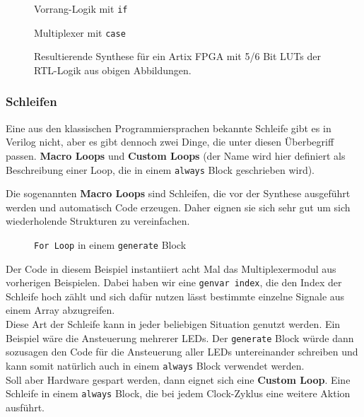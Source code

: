 \begin{figure}[H]	
\caption{Vorrang-Logik mit \texttt{if}}
\label{fig:if_vorrang}
\end{figure}

\begin{figure}[H]	
\caption{Multiplexer mit \texttt{case}} 
\label{fig:case_multiplexer}
\end{figure}


\begin{figure}[H]	
\caption[Synthese für ein Artix FPGA mit 5/6 Bit LUTs]{Resultierende Synthese für ein Artix FPGA mit 5/6 Bit LUTs der RTL-Logik aus obigen Abbildungen.} 
\label{fig:Synthese_FPGA_Artix_Case_If}
\end{figure}

\subsubsection*{Schleifen}
Eine aus den klassischen Programmiersprachen bekannte Schleife gibt es in Verilog nicht, aber es gibt dennoch zwei Dinge, die unter diesen Überbegriff passen. \textbf{Macro Loops} und \textbf{Custom Loops} (der Name wird hier definiert als Beschreibung einer Loop, die in einem \texttt{always} Block geschrieben wird).

Die sogenannten \textbf{Macro Loops} sind Schleifen, die vor der Synthese ausgeführt werden und automatisch Code erzeugen. Daher eignen sie sich sehr gut um sich wiederholende Strukturen zu vereinfachen.

\begin{figure}[h]
	\lstset{style=verilog-style}
	
	\caption{\texttt{For Loop} in einem \texttt{generate} Block} \label{bspgenloop}
\end{figure}

Der Code in diesem Beispiel instantiiert acht Mal das Multiplexermodul aus vorherigen Beispielen. Dabei haben wir eine \texttt{genvar index}, die den Index der Schleife hoch zählt und sich dafür nutzen lässt bestimmte einzelne Signale aus einem Array abzugreifen. \\
Diese Art der Schleife kann in jeder beliebigen Situation genutzt werden. Ein Beispiel wäre die Ansteuerung mehrerer LEDs. Der \texttt{generate} Block würde dann sozusagen den Code für die Ansteuerung aller LEDs untereinander schreiben und kann somit natürlich auch in einem \texttt{always} Block verwendet werden. \\
Soll aber Hardware gespart werden, dann eignet sich eine \textbf{Custom Loop}. Eine Schleife in einem \texttt{always} Block, die bei jedem Clock-Zyklus eine weitere Aktion ausführt.

